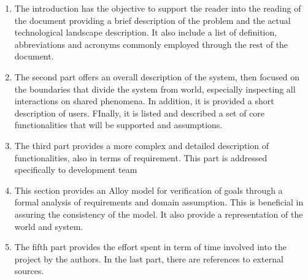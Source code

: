 \begin{enumerate}
	
	\item The introduction has the objective to support the reader into the reading of the document providing a brief description of the problem and the actual technological landscape description. It also include a list of definition, abbreviations and acronyms commonly employed through the rest of the document.
	\item The second part offers an overall description of the system, then focused on the boundaries that divide the system from world, especially inspecting all interactions on shared phenomena. In addition, it is provided a short description of users. FInally, it is listed and described a set of core functionalities that will be supported and assumptions.
	\item The third part provides a more complex and detailed description of functionalities, also in terms of requirement. This part is addressed specifically to development team
	\item This section provides an Alloy model for verification of goals through a formal analysis of requirements and domain assumption. This is beneficial in assuring the consistency of the model. It also provide a representation of the world and system.
	\item The fifth part provides the effort spent in term of time involved into the project by the authors.
	In the last part, there are references to external sources.
	
\end{enumerate}


